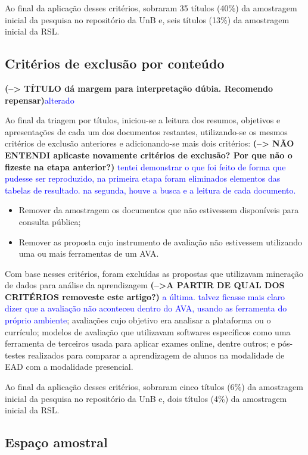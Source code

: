 Ao final da aplicação desses critérios, sobraram 35 títulos (40\%) da amostragem inicial da pesquisa no repositório da UnB e,  seis títulos (13\%) da amostragem inicial da RSL.

\subsection{Critérios de exclusão por conteúdo} \textbf{(--> TÍTULO dá margem para interpretação dúbia. Recomendo repensar)}\textcolor{blue} {alterado} %

Ao final da triagem por títulos, iniciou-se a leitura dos resumos, objetivos e apresentações de cada um dos documentos restantes, utilizando-se os mesmos critérios de exclusão anteriores e adicionando-se mais dois critérios: \textbf{(--> NÃO ENTENDI aplicaste novamente critérios de exclusão? Por que não o fizeste na etapa anterior?)} \textcolor{blue} {tentei demonstrar o que foi feito de forma que pudesse ser reproduzido, na primeira etapa foram eliminados elementos das tabelas de resultado. na segunda, houve a busca e a leitura de cada documento.}

\begin{itemize}
    \item Remover da amostragem os documentos que não estivessem disponíveis para consulta pública;
    \item Remover as proposta cujo instrumento de avaliação não estivessem utilizando uma ou mais ferramentas de um AVA.
\end{itemize}

Com base nesses critérios, foram excluídas as propostas que utilizavam mineração de dados para análise da aprendizagem \textbf{(-->A PARTIR DE QUAL DOS CRITÉRIOS removeste este artigo?)} \textcolor{blue} {a última. talvez ficasse mais claro dizer que a avaliação não aconteceu dentro do AVA, usando as ferramenta do próprio ambiente}; avaliações cujo objetivo era analisar a plataforma ou o currículo; modelos de avaliação que utilizavam softwares específicos como uma ferramenta de terceiros usada para aplicar exames online, dentre outros; e pós-testes realizados para comparar a aprendizagem de alunos na modalidade de EAD com a modalidade presencial.

Ao final da aplicação desses critérios, sobraram cinco títulos (6\%) da amostragem inicial da pesquisa no repositório da UnB e, dois títulos (4\%) da amostragem inicial da RSL.

\subsection{Espaço amostral}%

